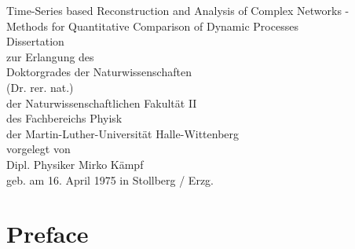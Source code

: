 \documentclass[a4paper,10pt]{scrbook}
\begin{document}

\begin{titlepage}

\begin{center}

\Huge Time-Series based Reconstruction and Analysis of Complex Networks -\\
\vspace{0.3cm}
\Large Methods for Quantitative Comparison of Dynamic Processes\\
\vspace{2cm}
\large Dissertation\\
zur Erlangung des \\
Doktorgrades der Naturwissenschaften\\(Dr. rer. nat.)\\
\vspace{2cm}
\large 
der Naturwissenschaftlichen Fakult\"at II \\
des Fachbereichs Phyisk \\
der Martin-Luther-Universit\"at Halle-Wittenberg\\
\vspace{1.5cm}
vorgelegt von \\
Dipl. Physiker Mirko K\"ampf\\
geb. am 16. April 1975 in Stollberg / Erzg.
\end{center}
\end{titlepage}




\tableofcontents



\chapter{Preface}

%
\end{document}

